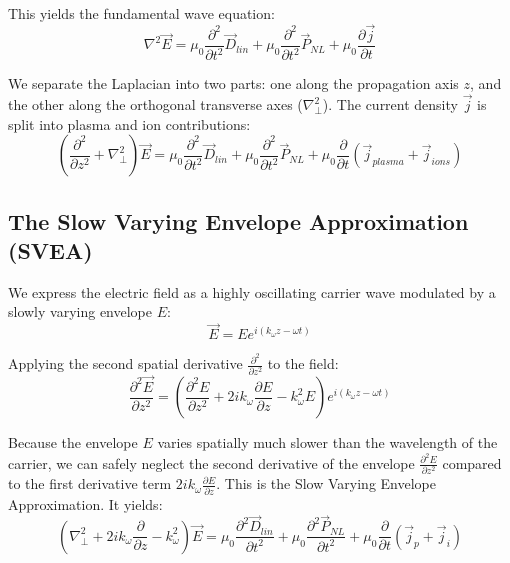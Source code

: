 This yields the fundamental wave equation:
\begin{equation}
\nabla^2 \vec{E} = \mu_0 \frac{\partial^2}{\partial t^2} \vec{D}_{lin} + \mu_0 \frac{\partial^2}{\partial t^2} \vec{P}_{NL} + \mu_0 \frac{\partial \vec{j}}{\partial t}
\end{equation}

We separate the Laplacian into two parts: one along the propagation axis $z$, and the other along the orthogonal transverse axes ($\nabla_\perp^2$). The current density $\vec{j}$ is split into plasma and ion contributions:
\begin{equation}
\left( \frac{\partial^2}{\partial z^2} + \nabla_\perp^2 \right) \vec{E} = \mu_0 \frac{\partial^2}{\partial t^2} \vec{D}_{lin} + \mu_0 \frac{\partial^2}{\partial t^2} \vec{P}_{NL} + \mu_0 \frac{\partial}{\partial t} (\vec{j}_{plasma} + \vec{j}_{ions})
\end{equation}

\subsection*{The Slow Varying Envelope Approximation (SVEA)}
We express the electric field as a highly oscillating carrier wave modulated by a slowly varying envelope $E$:
\begin{equation*}
\vec{E} = Ee^{i(k_{\omega}z-\omega t)}
\end{equation*}

Applying the second spatial derivative $\frac{\partial^2}{\partial z^2}$ to the field:
\begin{equation}
\frac{\partial^2 \vec{E}}{\partial z^2} = \left( \frac{\partial^2 E}{\partial z^2} + 2 i k_\omega \frac{\partial E}{\partial z} - k_\omega^2 E \right) e^{i(k_\omega z - \omega t)}
\end{equation}

Because the envelope $E$ varies spatially much slower than the wavelength of the carrier, we can safely neglect the second derivative of the envelope $\frac{\partial^2 E}{\partial z^2}$ compared to the first derivative term $2 i k_\omega \frac{\partial E}{\partial z}$. This is the Slow Varying Envelope Approximation. It yields:
\begin{equation}
\left( \nabla_\perp^2 + 2 i k_{\omega} \frac{\partial}{\partial z} - k_{\omega}^2 \right) \vec{E} = \mu_0 \frac{\partial^2 \vec{D}_{lin}}{\partial t^2} + \mu_0 \frac{\partial^2 \vec{P}_{NL}}{\partial t^2} + \mu_0 \frac{\partial}{\partial t} (\vec{j}_p + \vec{j}_i)
\end{equation}

